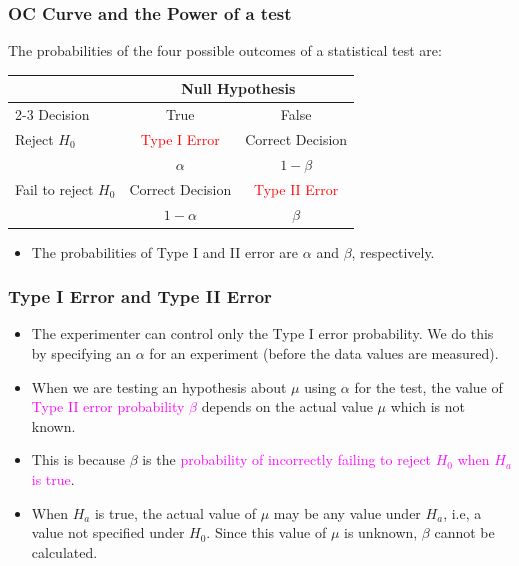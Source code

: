 \documentclass[xcolor=dvipsnames,12pt]{beamer}
\begin{document}
\begin{frame}
\frametitle{OC Curve and the Power of a test}
The probabilities of the  four possible outcomes of a statistical test are:\\
\begin{tabular}{l|c|c} 
& \multicolumn{2}{c}{Null Hypothesis} \\ \cline{2-3}
Decision & True & False \\ \hline
Reject $H_0$ & \textcolor{red}{Type I Error} & Correct Decision \\
             & $\alpha$     & $1-\beta$ \\[.2in] \hline
Fail to reject $H_0$ & Correct Decision & \textcolor{red}{Type II Error} \\
             & $1-\alpha$       & $\beta$ \\
    \hline          
\end{tabular}
\begin{itemize}
\item The probabilities of Type I and II error are $\alpha$ and $\beta$,
respectively. 
\end{itemize}
\end{frame}



\begin{frame}
\frametitle{Type I Error and Type II Error}
\begin{itemize}
\item The experimenter can control only the Type I error probability. We do this by specifying an
$\alpha$ for an experiment (before the data values are measured).
\item When we are testing an hypothesis about  $\mu$ using  $\alpha$
for the test, the  value of \textcolor{magenta}{Type II error probability $\beta$} 
depends on the actual value $\mu$ which is not known.
\item This is because $\beta$ is the \textcolor{magenta}{probability of incorrectly failing to reject $H_0$ when $H_a$ is true}.
\item When $H_a$ is true, the actual value of $\mu$ may be any value under $H_a$, 
i.e, a value not specified under $H_0$. Since this value of $\mu$ is unknown,  
$\beta$  cannot be calculated.
\end{itemize}
\end{frame}
\end{document}
